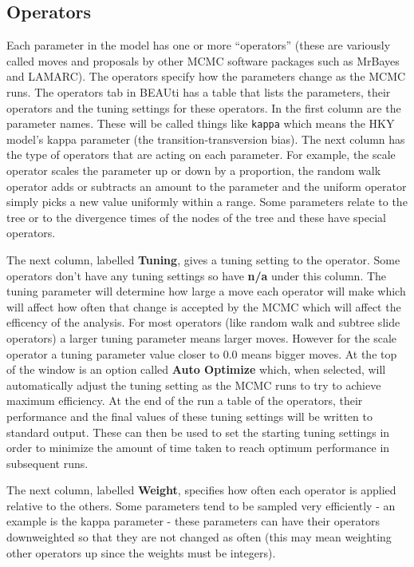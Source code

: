 \documentclass[11pt]{article}
\begin{document}
\subsection*{Operators}
Each parameter in the model has one or more ``operators'' (these are variously called moves and proposals by other MCMC
software packages such as MrBayes and LAMARC). The operators specify how the parameters change as the MCMC runs.
The operators tab in BEAUti has a table that lists the parameters, their operators and the tuning settings for these operators.
In the first column are the parameter names. These will be called things like \texttt{kappa} which means the HKY model's
kappa parameter (the transition-transversion bias). The next column has the type of operators that are acting on each
parameter. For example, the scale operator scales the parameter up or down by a proportion, the random walk operator
adds or subtracts an amount to the parameter and the uniform operator simply picks a new value uniformly within a range.
Some parameters relate to the tree or to the divergence times of the nodes of the tree and these have special operators.

The next column, labelled {\bf Tuning}, gives a tuning setting to the operator. Some operators don't have any tuning settings so
have {\bf n/a} under this column. The tuning parameter will determine how large a move each operator will make which will affect
how often that change is accepted by the MCMC which will affect the efficency of the analysis. For most operators (like
random walk and subtree slide operators) a larger tuning parameter means larger moves. However for the scale operator a
tuning parameter value closer to 0.0 means bigger moves. At the top of the window is an option called {\bf Auto Optimize}
which, when selected, will automatically adjust the tuning setting as the MCMC runs to try to achieve maximum efficiency. At
the end of the run a table of the operators, their performance and the final values of these tuning settings will be written to
standard output. These can then be used to set the starting tuning settings in order to minimize the amount of time taken to
reach optimum performance in subsequent runs.

The next column, labelled {\bf Weight}, specifies how often each operator is applied relative to the others. Some parameters
tend to be sampled very efficiently - an example is the kappa parameter - these parameters can have their operators downweighted
so that they are not changed as often (this may mean weighting other operators up since the weights must be
integers).
\fi
\end{document}
